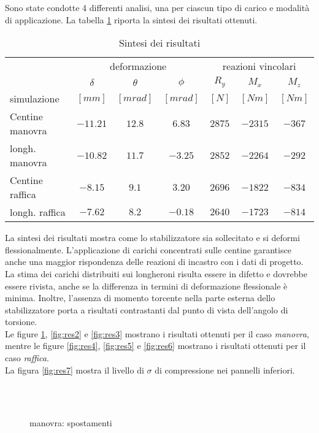 \documentclass[
10pt, %
a4paper, %
oneside, %
headinclude,footinclude, %
BCOR5mm, %
]{scrartcl}
\begin{document}
Sono state condotte 4 differenti analisi, una per ciascun tipo di carico e modalità di applicazione. La tabella \ref{tab:res} riporta la sintesi dei risultati ottenuti.

\begin{table}[bt]
	\caption{Sintesi dei risultati}
	\centering
	\begin{tabular}{lcccccc}
		\toprule
		& \multicolumn{3}{c}{deformazione} & \multicolumn{3}{c}{reazioni vincolari} \\
		\cmidrule(r){2-7}
		        & $\delta$ & $\theta$ & $\phi$ & $R_y$ & $M_x$ & $M_z$  \\
	simulazione	& $[mm]$  & $[mrad]$ & $[mrad]$ & $[N]$ & $[Nm]$ & $[Nm]$  \\
		\midrule
		Centine manovra & $-11.21$ & $12.8$ & $6.83$ & $2875$ & $-2315$ & $-367$  \\
		longh. manovra & $-10.82$ & $11.7$ & $-3.25$ & $2852$ & $-2264$ & $-292$  \\
		\midrule
		Centine raffica & $-8.15$ & $9.1$ & $3.20$ & $2696$ & $-1822$ & $-834$  \\
		longh. raffica & $-7.62$ & $8.2$ & $-0.18$ & $2640$ & $-1723$ & $-814$  \\				
		\bottomrule
	\end{tabular}
	\label{tab:res}
\end{table}


La sintesi dei risultati mostra come lo stabilizzatore sia sollecitato e si deformi flessionalmente. L'applicazione di carichi concentrati sulle centine garantisce anche una maggior rispondenza delle reazioni di incastro con i dati di progetto. \\
La stima dei carichi distribuiti sui longheroni risulta essere in difetto e dovrebbe essere rivista, anche se la differenza in termini di deformazione flessionale è minima. Inoltre, l'assenza di momento torcente nella parte esterna dello stabilizzatore porta a risultati contrastanti dal punto di vista dell'angolo di torsione.\\
Le figure \ref{fig:res1}, \ref{fig:res2} e \ref{fig:res3} mostrano i risultati ottenuti per il caso \emph{manovra}, mentre le figure \ref{fig:res4}, \ref{fig:res5} e \ref{fig:res6} mostrano i risultati ottenuti per il caso \emph{raffica}. \\
La figura \ref{fig:res7} mostra il livello di $\sigma$ di compressione nei pannelli inferiori.


\begin{figure}[htb]
	\centering
	 \\
	 \\
	\caption[manovra: spostamenti]{manovra: spostamenti} %
	\label{fig:res1}
\end{figure}
\end{document}
